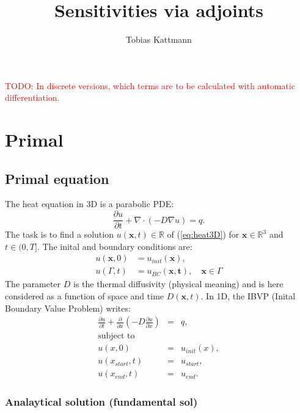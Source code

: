 \documentclass[10pt]{article}
\begin{document}
\title{Sensitivities via adjoints}
\author{Tobias Kattmann}
\maketitle
\tableofcontents
\textcolor{red}{TODO: In discrete versions, which terms are to be calculated with automatic differentiation.}
\section{Primal}
\subsection{Primal equation}
The heat equation in 3D is a parabolic PDE:
\begin{equation}\label{eq:heat3D}
\frac{\partial u}{\partial t} + \nabla\cdot \left(- D\nabla u \right) = q.
\end{equation}
The task is to find a solution $u\left(\mathbf{x}, t\right)\in\mathbb{R}$ of  (\ref{eq:heat3D}) for $\mathbf{x}\in\mathbb{R}^3$ and $t\in(0,T]$. The inital and boundary conditions are:
\begin{align}
u(\mathbf{x},0) & = u_{init}(\mathbf{x}), \\
u(\Gamma,t) & = u_{BC}(\mathbf{x,t}), \quad \mathbf{x}\in\Gamma
\end{align}
The parameter $D$ is the thermal diffusivity (physical meaning) and is here considered as a function of space and time $D\left(\mathbf{x},t\right)$. In 1D, the IBVP (Inital Boundary Value Problem) writes:
\begin{eqnarray}
\frac{\partial u}{\partial t} +\frac{\partial}{\partial x} \left(- D \frac{\partial u}{\partial x}  \right) &=& q, \\
\text{subject to} \\
u(x,0) &=& u_{init}(x), \\
u(x_{start},t)&=& u_{start}, \\
u(x_{end},t) &=& u_{end}.
\end{eqnarray}
\subsubsection{Analaytical solution (fundamental sol)}
\end{document}
